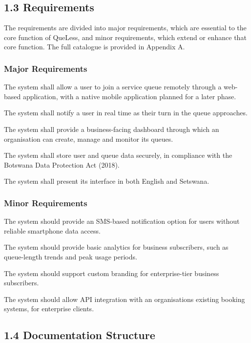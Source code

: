 \documentclass[
]{article}
\begin{document}
\subsection{1.3 Requirements}\label{requirements}

The requirements are divided into major requirements, which are
essential to the core function of QueLess, and minor requirements, which
extend or enhance that core function. The full catalogue is provided in
Appendix A.

\subsubsection{Major Requirements}\label{major-requirements}

The system shall allow a user to join a service queue remotely through a
web-based application, with a native mobile application planned for a
later phase.

The system shall notify a user in real time as their turn in the queue
approaches.

The system shall provide a business-facing dashboard through which an
organisation can create, manage and monitor its queues.

The system shall store user and queue data securely, in compliance with
the Botswana Data Protection Act (2018).

The system shall present its interface in both English and Setswana.

\subsubsection{Minor Requirements}\label{minor-requirements}

The system should provide an SMS-based notification option for users
without reliable smartphone data access.

The system should provide basic analytics for business subscribers, such
as queue-length trends and peak usage periods.

The system should support custom branding for enterprise-tier business
subscribers.

The system should allow API integration with an
organisation\textquotesingle s existing booking systems, for enterprise
clients.

\subsection{1.4 Documentation Structure}\label{documentation-structure}
\end{document}
